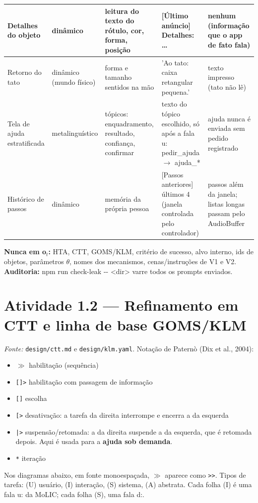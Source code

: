 \documentclass[a4paper,10pt]{article}
\begin{document}
\begin{longtable}{L{3cm} L{2.2cm} L{5cm} L{7cm} L{6cm}}
\midrule
Detalhes do objeto & dinâmico & leitura do texto do rótulo, cor, forma, posição & [Último anúncio] Detalhes: \ldots{} & nenhum (informação que o app de fato fala)\\
\midrule
Retorno do tato & dinâmico (mundo físico) & forma e tamanho sentidos na mão & 'Ao tato: caixa retangular pequena.' & texto impresso (tato não lê)\\
\midrule
Tela de ajuda estratificada & metalinguístico & tópicos: enquadramento, resultado, confiança, confirmar & texto do tópico escolhido, só após a fala u: pedir\_ajuda $\rightarrow$ ajuda\_* & ajuda nunca é enviada sem pedido registrado\\
\midrule
Histórico de passos & dinâmico & memória da própria pessoa & [Passos anteriores] últimos 4 (janela controlada pelo controlador) & passos além da janela; listas longas passam pelo AudioBuffer\\
\bottomrule
\end{longtable}
\noindent\textbf{Nunca em o$_t$:} HTA, CTT, GOMS/KLM, critério de sucesso, alvo interno, ids de objetos, parâmetros $\theta$, nomes dos mecanismos, cenas/instruções de V1 e V2. \textbf{Auditoria:} npm run check-leak -{}- <dir> varre todos os prompts enviados.

\section{Atividade 1.2 --- Refinamento em CTT e linha de base GOMS/KLM}
\emph{Fonte:} \texttt{design/ctt.md} e \texttt{design/klm.yaml}. Notação de Paternò (Dix et al., 2004):
\begin{itemize}\setlength\itemsep{0pt}
\item \texttt{$\gg$} habilitação (sequência)
\item \texttt{[]>} habilitação com passagem de informação
\item \texttt{[]} escolha
\item \texttt{[>} desativação: a tarefa da direita interrompe e encerra a da esquerda
\item \texttt{|>} suspensão/retomada: a da direita suspende a da esquerda, que é retomada depois. Aqui é usada para a \textbf{ajuda sob demanda}.
\item \texttt{*} iteração
\end{itemize}
Nos diagramas abaixo, em fonte monoespaçada, $\gg$ aparece como \texttt{>{}>}. Tipos de tarefa: (U) usuário, (I) interação, (S) sistema, (A) abstrata. Cada folha (I) é uma fala u: da MoLIC; cada folha (S), uma fala d:.
\end{document}
